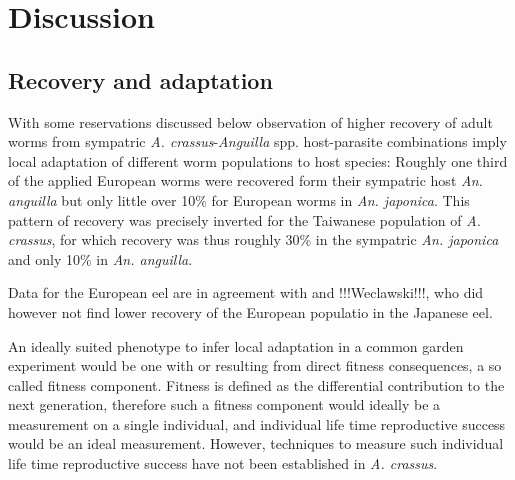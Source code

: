\documentclass[10pt]{article}
\begin{document}
\section{Discussion}



\subsection{Recovery and adaptation}
\label{sec:recovery}

With some reservations discussed below observation of higher recovery
of adult worms from sympatric \textit{A. crassus}-\textit{Anguilla}
spp. host-parasite combinations imply local adaptation of different
worm populations to host species: Roughly one third of the applied
European worms were recovered form their sympatric host
\textit{An. anguilla} but only little over 10\% for European worms in
\textit{An. japonica}. This pattern of recovery was precisely inverted
for the Taiwanese population of \textit{A. crassus}, for which
recovery was thus roughly 30\% in the sympatric \textit{An. japonica}
and only 10\% in \textit{An. anguilla}. 

Data for the European eel are in agreement with
\cite{knopf_differences_2004} and !!!Weclawski!!!, who did however not
find lower recovery of the European populatio in the Japanese eel.

An ideally suited phenotype to infer local adaptation in a common
garden experiment would be one with or resulting from direct fitness
consequences, a so called fitness component. Fitness is defined as the
differential contribution to the next generation, therefore such a
fitness component would ideally be a measurement on a single
individual, and individual life time reproductive success would be an
ideal measurement. However, techniques to measure such individual life
time reproductive success have not been established in
\textit{A. crassus}.
\end{document}
